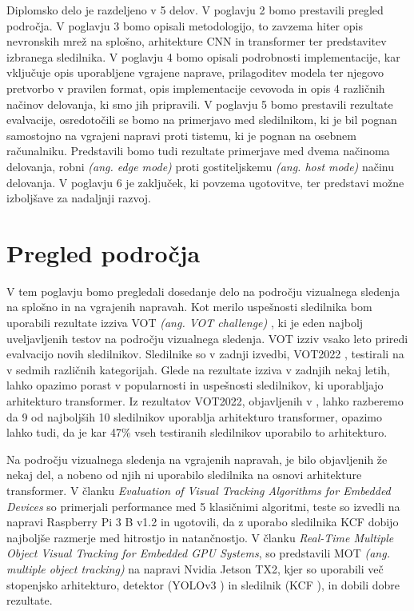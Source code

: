 \documentclass[a4paper,12pt,openright]{book}
\begin{document}
Diplomsko delo je razdeljeno v 5 delov. V poglavju 2 bomo prestavili pregled področja. V poglavju 3 bomo opisali metodologijo, to zavzema hiter opis nevronskih mrež na splošno, arhitekture CNN in transformer ter predstavitev izbranega sledilnika. V poglavju 4 bomo opisali podrobnosti implementacije, kar vključuje opis uporabljene vgrajene naprave, prilagoditev modela ter njegovo pretvorbo v pravilen format, opis implementacije cevovoda in opis 4 različnih načinov delovanja, ki smo jih pripravili. V poglavju 5 bomo prestavili rezultate evalvacije, osredotočili se bomo na primerjavo med sledilnikom, ki je bil pognan samostojno na vgrajeni napravi proti tistemu, ki je pognan na osebnem računalniku. Predstavili bomo tudi rezultate primerjave med dvema načinoma delovanja, robni \emph{(ang. edge mode)} proti gostiteljskemu \emph{(ang. host mode)} načinu delovanja. V poglavju 6 je zaključek, ki povzema ugotovitve, ter predstavi možne izboljšave za nadaljnji razvoj.

\chapter{Pregled področja}
\label{ch:0}
V tem poglavju bomo pregledali dosedanje delo na področju vizualnega sledenja na splošno in na vgrajenih napravah. Kot merilo uspešnosti sledilnika bom uporabili rezultate izziva VOT \emph{(ang. VOT challenge)} \cite{vot}, ki je eden najbolj uveljavljenih testov na področju vizualnega sledenja. VOT izziv vsako leto priredi evalvacijo novih sledilnikov. Sledilnike so v zadnji izvedbi, VOT2022 \cite{vot2022}, testirali na v sedmih različnih kategorijah. Glede na rezultate izziva v zadnjih nekaj letih, lahko opazimo porast v popularnosti in uspešnosti sledilnikov, ki uporabljajo arhitekturo transformer. Iz rezultatov VOT2022, objavljenih v \cite{vot2022}, lahko razberemo da 9 od najboljših 10 sledilnikov uporablja arhitekturo transformer, opazimo lahko tudi, da je kar 47\% vseh testiranih sledilnikov uporabilo to arhitekturo.

Na področju vizualnega sledenja na vgrajenih napravah, je bilo objavljenih že nekaj del, a nobeno od njih ni uporabilo sledilnika na osnovi arhitekture transformer. V članku \emph{Evaluation of Visual Tracking Algorithms for Embedded Devices}\cite{evaluation_of_visual_tracking_algorithms_for_embedded_devices} so primerjali performance med 5 klasičnimi algoritmi, teste so izvedli na napravi Raspberry Pi 3 B v1.2 in ugotovili, da z uporabo sledilnika KCF dobijo najboljše razmerje med hitrostjo in natančnostjo. V članku \emph{Real-Time Multiple Object Visual Tracking for Embedded GPU Systems}\cite{real_time_multiple_object_visual_tracking_for_embedded_gpu_systems}, so predstavili MOT \emph{(ang. multiple object tracking)} na napravi Nvidia Jetson TX2, kjer so uporabili več stopenjsko arhitekturo, detektor (YOLOv3 \cite{yolov3}) in sledilnik (KCF \cite{kcf}), in dobili dobre rezultate.
\end{document}
